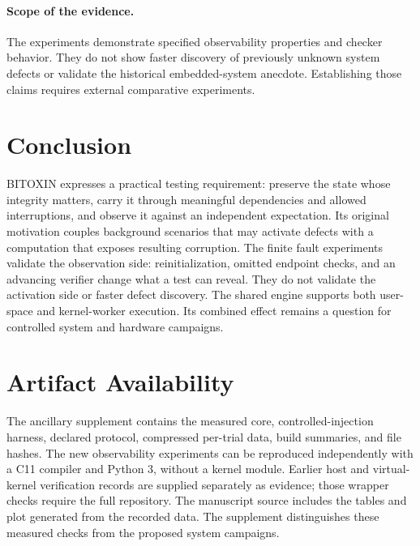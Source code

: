 \documentclass[10pt,twocolumn,letterpaper]{article}
\begin{document}
\paragraph{Scope of the evidence.}
The experiments demonstrate specified observability properties and checker behavior. They do not show faster discovery of previously unknown system defects or validate the historical embedded-system anecdote. Establishing those claims requires external comparative experiments.

\section{Conclusion}
BITOXIN expresses a practical testing requirement: preserve the state whose integrity matters, carry it through meaningful dependencies and allowed interruptions, and observe it against an independent expectation. Its original motivation couples background scenarios that may activate defects with a computation that exposes resulting corruption. The finite fault experiments validate the observation side: reinitialization, omitted endpoint checks, and an advancing verifier change what a test can reveal. They do not validate the activation side or faster defect discovery. The shared engine supports both user-space and kernel-worker execution. Its combined effect remains a question for controlled system and hardware campaigns.

\section*{Artifact Availability}
The ancillary supplement contains the measured core, controlled-injection harness, declared protocol, compressed per-trial data, build summaries, and file hashes. The new observability experiments can be reproduced independently with a C11 compiler and Python 3, without a kernel module. Earlier host and virtual-kernel verification records are supplied separately as evidence; those wrapper checks require the full repository. The manuscript source includes the tables and plot generated from the recorded data. The supplement distinguishes these measured checks from the proposed system campaigns.


{\raggedright}
\end{document}
